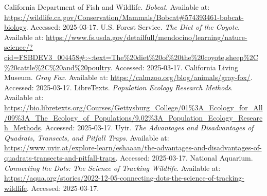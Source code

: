 \documentclass[a4paper]{article}
\begin{document}
\newpage

\begin{thebibliography}{99}

     California Department of Fish and Wildlife. \textit{Bobcat}. Available at: \url{https://wildlife.ca.gov/Conservation/Mammals/Bobcat#574393461-bobcat-biology}. Accessed: 2025-03-17.
     U.S. Forest Service. \textit{The Diet of the Coyote}. Available at: \url{https://www.fs.usda.gov/detailfull/mendocino/learning/nature-science/?cid=FSBDEV3_004458#:~:text=The%20diet%20of%20the%20coyote,sheep%2C%20cattle%2C%20and%20poultry}. Accessed: 2025-03-17.
     California Living Museum. \textit{Gray Fox}. Available at: \url{https://calmzoo.org/blog/animals/gray-fox/}. Accessed: 2025-03-17.
     LibreTexts. \textit{Population Ecology Research Methods}. Available at: \url{https://bio.libretexts.org/Courses/Gettysburg_College/01%3A_Ecology_for_All/09%3A_The_Ecology_of_Populations/9.02%3A_Population_Ecology_Research_Methods}. Accessed: 2025-03-17.
     Uyir. \textit{The Advantages and Disadvantages of Quadrats, Transects, and Pitfall Traps}. Available at: \url{https://www.uyir.at/explore-learn/eshaaan/the-advantages-and-disadvantages-of-quadrats-transects-and-pitfall-traps}. Accessed: 2025-03-17.
     National Aquarium. \textit{Connecting the Dots: The Science of Tracking Wildlife}. Available at: \url{https://aqua.org/stories/2022-12-05-connecting-dots-the-science-of-tracking-wildlife}. Accessed: 2025-03-17.


    
\end{thebibliography}
\end{document}
